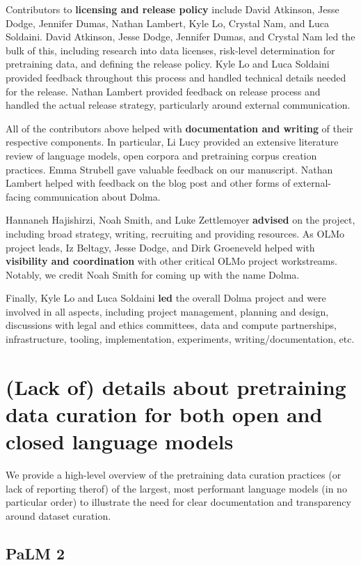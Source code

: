 \documentclass{article}
\begin{document}
Contributors to \textbf{licensing and release policy} include David Atkinson, Jesse Dodge, Jennifer Dumas, Nathan Lambert, Kyle Lo, Crystal Nam, and Luca Soldaini. 
David Atkinson, Jesse Dodge, Jennifer Dumas, and Crystal Nam led the bulk of this, including research into data licenses, risk-level determination for pretraining data, and defining the release policy. 
Kyle Lo and Luca Soldaini provided feedback throughout this process and handled technical details needed for the release.
Nathan Lambert provided feedback on release process and handled the actual release strategy, particularly around external communication.

All of the contributors above helped with \textbf{documentation and writing} of their respective components. In particular, Li Lucy provided an extensive literature review of language models, open corpora and pretraining corpus creation practices. Emma Strubell gave valuable feedback on our manuscript.
Nathan Lambert helped with feedback on the blog post and other forms of external-facing communication about Dolma.

Hannaneh Hajishirzi, Noah Smith, and Luke Zettlemoyer \textbf{advised} on the project, including broad strategy, writing, recruiting and providing resources. As OLMo project leads, Iz Beltagy, Jesse Dodge, and Dirk Groeneveld helped with \textbf{visibility and coordination} with other critical OLMo project workstreams. Notably, we credit Noah Smith for coming up with the name Dolma.

Finally, Kyle Lo and Luca Soldaini \textbf{led} the overall Dolma project and were involved in all aspects, including project management, planning and design, discussions with legal and ethics committees, data and compute partnerships, infrastructure, tooling, implementation, experiments, writing/documentation, etc.

\section{(Lack of) details about pretraining data curation for both open and closed language models}
\label{sec:pretrain-data-llms}

We provide a high-level overview of the pretraining data curation practices (or lack of reporting therof) of the largest, most performant language models (in no particular order) to illustrate the need for clear documentation and transparency around dataset curation.

\subsection{PaLM 2~\citep{Anil2023PaLM2T}}\label{appendix:llm:palm2} 
\end{document}
